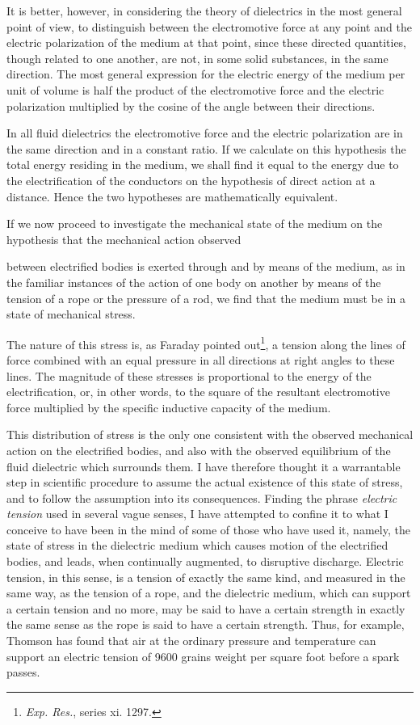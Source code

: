 \documentclass[11pt,a4paper]{article}
\begin{document}
It is better, however, in considering the theory of dielectrics in
the most general point of view, to distinguish between the electromotive
force at any point and the electric polarization of the medium at
that point, since these directed quantities, though related to one
another, are not, in some solid substances, in the same direction.
The most general expression for the electric energy of the medium
per unit of volume is half the product of the electromotive force
and the electric polarization multiplied by the cosine of the angle
between their directions.

In all fluid dielectrics the electromotive force and the electric
polarization are in the same direction and in a constant ratio.
If we calculate on this hypothesis the total energy residing in
the medium, we shall find it equal to the energy due to the
electrification of the conductors on the hypothesis of direct action
at a distance. Hence the two hypotheses are mathematically equivalent.

If we now proceed to investigate the mechanical state of the
medium on the hypothesis that the mechanical action observed

\clearpage
\setcounter{footnote}{0}

between electrified bodies is exerted through and by means of
the medium, as in the familiar instances of the action of one body
on another by means of the tension of a rope or the pressure of
a rod, we find that the medium must be in a state of mechanical
stress.

The nature of this stress is, as Faraday pointed out\footnote{\textit{Exp. Res.}, series xi. 1297.},
a tension along the lines of force combined with an equal pressure
in all directions at right angles to these lines. The magnitude of
these stresses is proportional to the energy of the electrification,
or, in other words, to the square of the resultant electromotive
force multiplied by the specific inductive capacity of the medium.

This distribution of stress is the only one consistent with the
observed mechanical action on the electrified bodies, and also with
the observed equilibrium of the fluid dielectric which surrounds
them. I have therefore thought it a warrantable step in scientific
procedure to assume the actual existence of this state of stress,
and to follow the assumption into its consequences. Finding the
phrase \textit{electric tension} used in several vague senses, I have
attempted to confine it to what I conceive to have been in the mind
of some of those who have used it, namely, the state of stress in
the dielectric medium which causes motion of the electrified bodies,
and leads, when continually augmented, to disruptive discharge.
Electric tension, in this sense, is a tension of exactly the same
kind, and measured in the same way, as the tension of a rope,
and the dielectric medium, which can support a certain tension
and no more, may be said to have a certain strength in exactly
the same sense as the rope is said to have a certain strength.
Thus, for example, Thomson has found that air at the ordinary
pressure and temperature can support an electric tension of 9600
grains weight per square foot before a spark passes.
\end{document}
